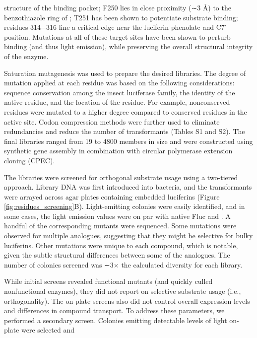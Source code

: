 structure of the binding pocket;\cite{BRANCHINI:2001gr} F250 lies in close proximity
(∼3 Å) to the benzothiazole ring of \dluciferin{}; T251 has been
shown to potentiate substrate binding;\cite{Branchini:2003kt} residues 314−316 line
a critical edge near the luciferin phenolate and C7′ position.
Mutations at all of these target sites have been shown to perturb \dluciferin{} binding (and thus light emission), while
preserving the overall structural integrity of the enzyme.\cite{Branchini:2007bw, Branchini:2003kt, Viviani:2013ej}
\par
Saturation mutagenesis was used to prepare the desired
libraries. The degree of mutation applied at each residue was
based on the following considerations: sequence conservation
among the insect luciferase family, the identity of the native
residue, and the location of the residue. For example,
nonconserved residues were mutated to a higher degree
compared to conserved residues in the active site. Codon
compression methods were further used to eliminate
redundancies and reduce the number of transformants (Tables
S1 and S2).\cite{Pines:2014he} The final libraries ranged from 19 to 4800
members in size and were constructed using synthetic gene
assembly\cite{Ness:2002cc} in combination with circular polymerase
extension
cloning (CPEC).\cite{Quan:2011fa}
\par
The libraries were screened for orthogonal substrate usage
using a two-tiered approach. Library DNA was first introduced
into bacteria, and the transformants were arrayed across agar
plates containing embedded luciferins (Figure \ref{fig:residues_screening}B). Light-emitting
colonies were easily identified, and in
some cases, the light emission values were on par with native
Fluc and \dluciferin{}. A handful of the
corresponding mutants were sequenced. Some mutations
were observed for multiple analogues, suggesting that they
might be selective for bulky luciferins. Other
mutations were unique to each compound, which is notable,
given the subtle structural differences between some of the
analogues. The number of colonies screened was ∼3× the
calculated diversity for each library.
\par
While initial screens revealed functional mutants (and
quickly culled nonfunctional enzymes), they did not report
on selective substrate usage (i.e., orthogonality). The on-plate
screens also did not control overall expression levels and
differences in compound transport. To address these
parameters, we performed a secondary screen. Colonies
emitting detectable levels of light on-plate were selected and
